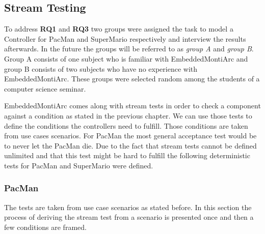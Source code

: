 \subsection{Stream Testing}
To address \textbf{RQ1} and \textbf{RQ3} two groups were assigned the task to model a Controller for PacMan and SuperMario respectively and interview the results afterwards. In the future the groups will be referred to as \textit{group A} and \textit{group B}. Group A consists of one subject who is familiar with EmbeddedMontiArc and group B consists of two subjects who have no experience with EmbeddedMontiArc. These groups were selected random among the students of a computer science seminar. 

EmbeddedMontiArc comes along with stream tests in order to check a component against a condition as stated in the previous chapter.
We can use those tests to define the conditions the controllers need to fulfill. Those conditions are taken from use cases scenarios. For PacMan the most general acceptance test would be to never let the PacMan die. Due to the fact that stream tests cannot be defined unlimited and that this test might be hard to fulfill the following deterministic tests for PacMan and SuperMario were defined.

\subsubsection{PacMan}
The tests are taken from use case scenarios as stated before. In this section the process of deriving the stream test from a scenario is presented once and then a few conditions are framed. \newline

